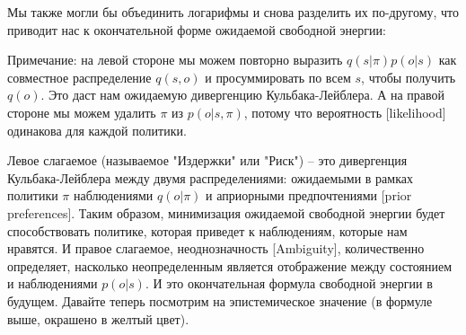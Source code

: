 \documentclass[twoside,leqno, 11pt]{article}
\begin{document}
	Мы также могли бы объединить логарифмы и снова разделить их по-другому, что приводит нас к окончательной форме ожидаемой свободной энергии:
	
	
	\newpage
	
	\begin{figure}[h!]
	\end{figure}
	
	Примечание: на левой стороне мы можем повторно выразить $q(s|\pi) p(o|s)$ как совместное распределение $q(s,o)$ и просуммировать по всем $s$, чтобы получить $q(o)$. Это даст нам ожидаемую дивергенцию Кульбака-Лейблера. А на правой стороне мы можем удалить $\pi$ из $p(o|s,\pi)$, потому что вероятность [likelihood] одинакова для каждой политики.
	
	
	Левое слагаемое (называемое "Издержки" или "Риск") -- это дивергенция Кульбака-Лейблера между двумя распределениями: ожидаемыми в рамках политики $\pi$ наблюдениями $q(o|\pi)$ и априорными предпочтениями [prior preferences]. Таким образом, минимизация ожидаемой свободной энергии будет способствовать политике, которая приведет к наблюдениям, которые нам нравятся. И правое слагаемое, неоднозначность [Ambiguity], количественно определяет, насколько неопределенным является отображение между состоянием и наблюдениями $p(o|s)$. И это окончательная формула свободной энергии в будущем. Давайте теперь посмотрим на эпистемическое значение (в формуле выше, окрашено в желтый цвет).
	
\end{document}
